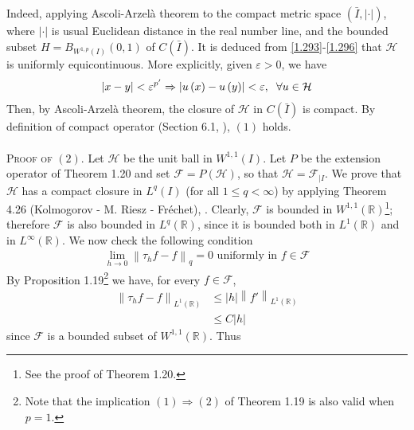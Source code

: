 \documentclass[a4paper,oneside]{article}
\numberwithin{equation}{section}
\begin{document}
Indeed, applying Ascoli-Arzel\`{a} theorem to the compact metric space $\left( {\bar I,\left|  \cdot  \right|} \right)$, where ${\left|  \cdot  \right|}$ is usual Euclidean distance in the real number line, and the bounded subset $H = {B_{{W^{1,p}}\left( I \right)}}\left( {0,1} \right)$ of $C\left( {\bar I} \right)$. It is deduced from \eqref{1.293}-\eqref{1.296} that $\mathcal{H}$ is uniformly equicontinuous. More explicitly, given $\varepsilon >0$, we have
\begin{align}
\left| {x - y} \right| < {\varepsilon ^{p'}} \Rightarrow \left| {u\left( x \right) - u\left( y \right)} \right| < \varepsilon ,\hspace{0.2cm}\forall u \in \mathcal{H}
\end{align}
Then, by Ascoli-Arzel\`{a} theorem, the closure of $\mathcal{H}$ in $C\left(\bar{I}\right)$ is compact. By definition of compact operator (Section 6.1, \cite{1}), $\left(1\right)$ holds.\\
\\
\textsc{Proof of $\left(2\right)$.} Let $\mathcal{H}$ be the unit ball in $W^{1,1}\left(I\right)$. Let $P$ be the extension operator of Theorem 1.20 and set $\mathcal{F}=P\left(\mathcal{H}\right)$, so that $\mathcal{H} = {\mathcal{F}_{\left| I \right.}}$. We prove that $\mathcal{H}$ has a compact closure in $L^q\left(I\right)$ (for all $1 \le q<\infty$) by applying Theorem 4.26 (Kolmogorov - M. Riesz - Fr\'{e}chet), \cite{1}. Clearly, $\mathcal{F}$ is bounded in $W^{1,1}\left(\mathbb{R}\right)$\footnote{See the proof of Theorem 1.20.}; therefore $\mathcal{F}$ is also bounded in $L^q\left(\mathbb{R}\right)$, since it is bounded both in $L^1\left(\mathbb{R}\right)$ and in $L^{\infty}\left(\mathbb{R}\right)$. We now check the following condition
\begin{align}
\mathop {\lim }\limits_{h \to 0} {\left\| {{\tau _h}f - f} \right\|_q} = 0\mbox{ uniformly in } f  \in \mathcal{F}
\end{align}
By Proposition 1.19\footnote{Note that the implication $\left(1\right) \Rightarrow \left(2\right)$ of Theorem 1.19 is also valid when $p=1$.} we have, for every $f\in \mathcal{F}$,
\begin{align}
{\left\| {{\tau _h}f - f} \right\|_{{L^1}\left( \mathbb{R} \right)}} &\le \left| h \right|{\left\| {f'} \right\|_{{L^1}\left(\mathbb{R} \right)}}\\
 &\le C\left| h \right|
\end{align}
since $\mathcal{F}$ is a bounded subset of $W^{1,1}\left(\mathbb{R}\right)$. Thus
\end{document}
